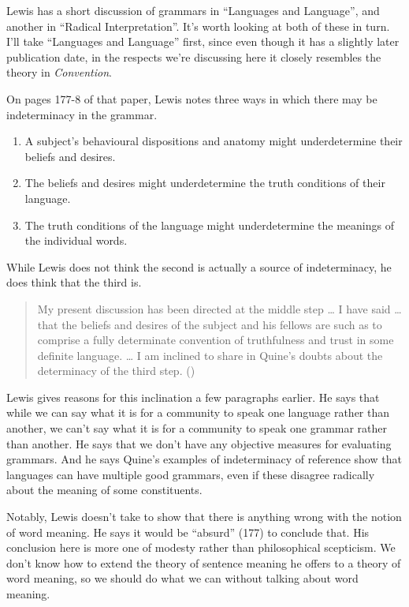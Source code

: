 \documentclass[
  11pt,
  letterpaper,
  DIV=11,
  numbers=noendperiod,
  twoside]{scrartcl}
\providecommand{\tightlist}{%
  \setlength{\itemsep}{0pt}\setlength{\parskip}{0pt}}
\begin{document}
Lewis has a short discussion of grammars in ``Languages and Language'',
and another in ``Radical Interpretation''. It's worth looking at both of
these in turn. I'll take ``Languages and Language'' first, since even
though it has a slightly later publication date, in the respects we're
discussing here it closely resembles the theory in \emph{Convention}.

On pages 177-8 of that paper, Lewis notes three ways in which there may
be indeterminacy in the grammar.

\begin{enumerate}
\def\labelenumi{\arabic{enumi}.}
\tightlist
\item
  A subject's behavioural dispositions and anatomy might underdetermine
  their beliefs and desires.
\item
  The beliefs and desires might underdetermine the truth conditions of
  their language.
\item
  The truth conditions of the language might underdetermine the meanings
  of the individual words.
\end{enumerate}

While Lewis does not think the second is actually a source of
indeterminacy, he does think that the third is.

\begin{quote}
My present discussion has been directed at the middle step \ldots{} I
have said \ldots{} that the beliefs and desires of the subject and his
fellows are such as to comprise a fully determinate convention of
truthfulness and trust in some definite language. \ldots{} I am inclined
to share in Quine's doubts about the determinacy of the third step.
()
\end{quote}

Lewis gives reasons for this inclination a few paragraphs earlier. He
says that while we can say what it is for a community to speak one
language rather than another, we can't say what it is for a community to
speak one grammar rather than another. He says that we don't have any
objective measures for evaluating grammars. And he says Quine's examples
of indeterminacy of reference show that languages can have multiple good
grammars, even if these disagree radically about the meaning of some
constituents.

Notably, Lewis doesn't take to show that there is anything wrong with
the notion of word meaning. He says it would be ``absurd'' (177) to
conclude that. His conclusion here is more one of modesty rather than
philosophical scepticism. We don't know how to extend the theory of
sentence meaning he offers to a theory of word meaning, so we should do
what we can without talking about word meaning.
\end{document}
